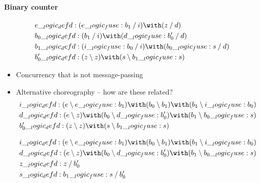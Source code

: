 \paragraph*{Binary counter}

\begin{equation*}
  \begin{lgathered}
    e \defd (e \fuse b_1 \pmir i) \with (z \pmir d) \\
    b_0 \defd (b_1 \pmir i) \with (d \fuse b'_0 \pmir d) \\
    b_1 \defd (i \fuse b_0 \pmir i) \with (b_0 \fuse s \pmir d) \\
    b'_0 \defd (z \limp z) \with (s \limp b_1 \fuse s)
  \end{lgathered}
\end{equation*}

\begin{itemize}
\item Concurrency that is not message-passing
\item Alternative choreography -- how are these related?
\begin{equation*}
  \begin{lgathered}
    i \defd (e \limp e \fuse b_1) \with (b_0 \limp b_1) \with (b_1 \limp i \fuse b_0) \\
    d \defd (e \limp z) \with (b_0 \limp d \fuse b'_0) \with (b_1 \limp b_0 \fuse s) \\
    b'_0 \defd (z \limp z) \with (s \limp b_1 \fuse s)
  \end{lgathered}
\end{equation*}

\begin{equation*}
  \begin{lgathered}
    i \defd (e \limp e \fuse b_1) \with (b_0 \limp b_1) \with (b_1 \limp i \fuse b_0) \\
    d \defd (e \limp z) \with (b_0 \limp d \fuse b'_0) \with (b_1 \limp b_0 \fuse s) \\
    z \defd z \pmir b'_0 \\
    s \defd b_1 \fuse s \pmir b'_0
  \end{lgathered}
\end{equation*}
\end{itemize}


\section{}



